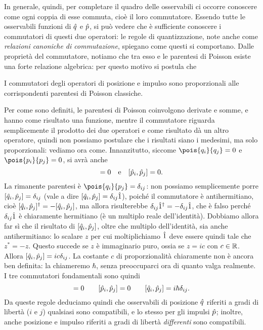 In generale, quindi, per completare il quadro delle osservabili ci occorre conoscere come ogni coppia di esse commuta, cioè il loro commutatore.
Essendo tutte le osservabili funzioni di $\hat{q}$ e $\hat{p}$, si può vedere che è sufficiente conoscere i commutatori di questi due operatori: le regole di quantizzazione, note anche come \emph{relazioni canoniche di commutazione}, spiegano come questi si comportano.
Dalle proprietà del commutatore, notiamo che tra esso e le parentesi di Poisson esiste una forte relazione algebrica: per questo motivo si postula che
\begin{postulato}
	I commutatori degli operatori di posizione e impulso sono proporzionali alle corrispondenti parentesi di Poisson classiche.
\end{postulato}
Per come sono definiti, le parentesi di Poisson coinvolgono derivate e somme, e hanno come risultato una funzione, mentre il commutatore riguarda semplicemente il prodotto dei due operatori e come risultato dà un altro operatore, quindi non possiamo postulare che i risultati siano i medesimi, ma solo proporzionali: vediamo ora come.
Innanzitutto, siccome $\pois{q_i}{q_j}=0$ e $\pois{p_i}{p_j}=0$, si avrà anche
\begin{equation}
	[\op q_i,\op q_j]=0\quad\text{e}\quad[\op p_i,\op p_j]=0.
\end{equation}
La rimanente parentesi è $\pois{q_i}{p_j}=\delta_{ij}$: non possiamo semplicemente porre $[\hat{q}_i,\hat{p}_j]=\delta_{ij}$ (vale a dire $[\hat{q}_i,\hat{p}_j]=\delta_{ij}\hat{1}$), poich\'e il commutatore è antihermitiano, cioè $[\hat{q}_i,\hat{p}_j]^\dagger=-[\hat{q}_i,\hat{p}_j]$, ma allora risulterebbe $\delta_{ij}\hat{1}^\dagger=-\delta_{ij}\hat{1}$, che è falso perch\'e $\delta_{ij}\hat{1}$ è chiaramente hermitiano (è un multiplo reale dell'identità).
Dobbiamo allora far s\`i che il risultato di $[\hat{q}_i,\hat{p}_j]$, oltre che multiplo dell'identità, sia anche antihermitiano: lo scalare $z$ per cui moltiplichiamo $\hat{1}$ deve essere quindi tale che $z^*=-z$.
Questo succede se $z$ è immaginario puro, ossia se $z=ic$ con $c\in\mathbb{R}$.
Allora $[\hat{q}_i,\hat{p}_j]=ic\delta_{ij}$.
La costante $c$ di proporzionalità chiaramente non è ancora ben definita: la chiameremo $\hbar$, senza preoccuparci ora di quanto valga realmente.
I tre commutatori fondamentali sono quindi
\begin{equation}
	[\op q_i,\op q_j]=0\qquad[\op p_i,\op p_j]=0\qquad[\op q_i,\op p_j]=i\hbar\delta_{ij}.
	\label{eq:commutatori-fondamentali}
\end{equation}
Da queste regole deduciamo quindi che osservabili di posizione $\hat{q}$ riferiti a gradi di libertà ($i$ e $j$) qualsiasi sono compatibili, e lo stesso per gli impulsi $\hat{p}$; inoltre, anche posizione e impulso riferiti a gradi di libertà \emph{differenti} sono compatibili.
